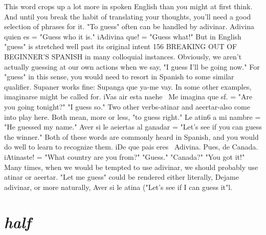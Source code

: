 {{{{%
This word crops up a lot more in spoken English than you
might at first think. And until you break the habit of translating your
thoughts, you'll need a good selection of phrases for it. "To guess" often can be handled by adivinar. Adivina quien es = "Guess who it
is." iAdivina que! = "Guess what!"
But in English "guess" is stretched well past its original intent
156 BREAKING OUT OF BEGINNER'S SPANISH
in many colloquial instances. Obviously, we aren't actually guessing at
our own actions when we say, "I guess I'll be going now." For "guess"
in this sense, you would need to resort in Spanish to some similar
qualifier. Supaner works fine: Supanga que ya-me vay. In some other
examples, imaginarse might be called for. iVas air esta naehe~ Me
imagina que sf. = "Are you going tonight?" "I guess so."
Two other verbs-atinar and aeertar-also come into play
here. Both mean, more or less, "to guess right." Le atin6 a mi nambre
= "He guessed my name." Aver si le aeiertas al ganadar = "Let's see
if you can guess the winner." Both of these words are commonly heard
in Spanish, and you would do well to learn to recognize them. iDe que
pais eres~ Adivina. Pues, de Canada. iAtinaste! = "What country are
you from?" "Guess." "Canada?" "You got it!" Many times, when we
would be tempted to use adivinar, we should probably use atinar or
aeertar. "Let me guess" could be rendered either literally, Dejame adivinar, or more naturally, Aver si le atina ("Let's see if I can guess it"l.

\section{\emph{half}}

}}}}
